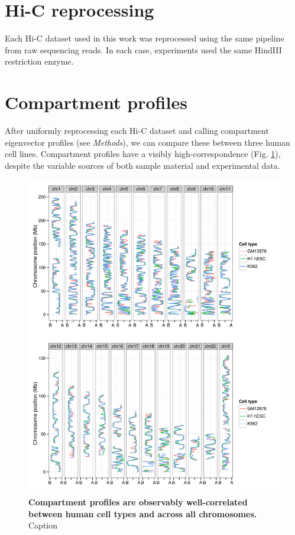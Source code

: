 \documentclass[a4paper,10pt,oneside]{book}
\begin{document}

\section{Hi-C reprocessing}

Each Hi-C dataset used in this work was reprocessed using the same pipeline from raw sequencing reads. In each case, experiments used the same HindIII restriction enzyme.



\section{Compartment profiles}

After uniformly reprocessing each Hi-C dataset and calling compartment eigenvector profiles (see \emph{Methods}), we can compare these between three human cell lines. Compartment profiles have a visibly high-correspondence (Fig. \ref{fig:wiggles}), despite the variable sources of both sample material and experimental data.

\begin{figure}
\begin{center}
\includegraphics[width=1.2\textwidth]{figs/wiggles.pdf}
\captionsetup{width=\textwidth}
\caption{
{\bf Compartment profiles are observably well-correlated between human cell types and across all chromosomes.}
Caption
}\label{fig:wiggles}
\end{center}
\end{figure} 
\end{document}
